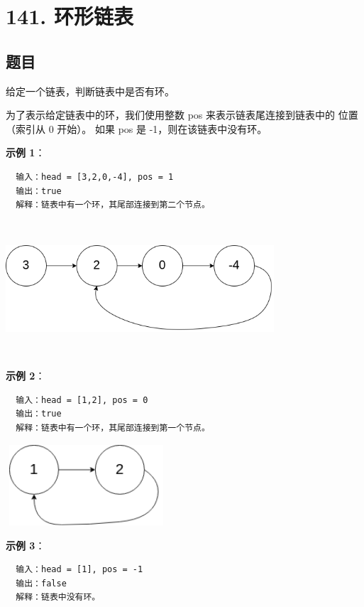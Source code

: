 \newpage
\section{141. 环形链表}
\label{leetcode:141}

\subsection{题目}

给定一个链表，判断链表中是否有环。

为了表示给定链表中的环，我们使用整数 pos 来表示链表尾连接到链表中的
位置（索引从 0 开始）。 如果 pos 是 -1，则在该链表中没有环。

\textbf{示例 1}：

\begin{verbatim}
  输入：head = [3,2,0,-4], pos = 1
  输出：true
  解释：链表中有一个环，其尾部连接到第二个节点。
\end{verbatim}

\includegraphics[width=100mm,height=50mm]{images/leetcode/circularlinkedlist.png}

\textbf{示例 2}：

\begin{verbatim}
  输入：head = [1,2], pos = 0
  输出：true
  解释：链表中有一个环，其尾部连接到第一个节点。
\end{verbatim}

\includegraphics[width=60mm,height=30mm]{images/leetcode/circularlinkedlist_test2.png}

\textbf{示例 3}：

\begin{verbatim}
  输入：head = [1], pos = -1
  输出：false
  解释：链表中没有环。
\end{verbatim}

